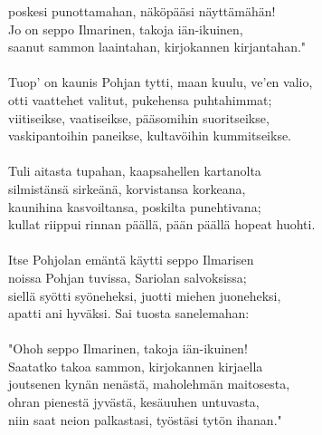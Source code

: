 poskesi punottamahan, näköpääsi näyttämähän!                      \\
Jo on seppo Ilmarinen, takoja iän-ikuinen,                        \\
saanut sammon laaintahan, kirjokannen kirjantahan."               \\
                                                                  \\
Tuop' on kaunis Pohjan tytti, maan kuulu, ve'en valio,            \\
otti vaattehet valitut, pukehensa puhtahimmat;                    \\
viitiseikse, vaatiseikse, pääsomihin suoritseikse,                \\
vaskipantoihin paneikse, kultavöihin kummitseikse.                \\
                                                                  \\
Tuli aitasta tupahan, kaapsahellen kartanolta                     \\
silmistänsä sirkeänä, korvistansa korkeana,                       \\
kaunihina kasvoiltansa, poskilta punehtivana;                     \\
kullat riippui rinnan päällä, pään päällä hopeat huohti.          \\
                                                                  \\
Itse Pohjolan emäntä käytti seppo Ilmarisen                       \\
noissa Pohjan tuvissa, Sariolan salvoksissa;                      \\
siellä syötti syöneheksi, juotti miehen juoneheksi,               \\
apatti ani hyväksi. Sai tuosta sanelemahan:                       \\
                                                                  \\
"Ohoh seppo Ilmarinen, takoja iän-ikuinen!                        \\
Saatatko takoa sammon, kirjokannen kirjaella                      \\
joutsenen kynän nenästä, maholehmän maitosesta,                   \\
ohran pienestä jyvästä, kesäuuhen untuvasta,                      \\
niin saat neion palkastasi, työstäsi tytön ihanan."               \\
